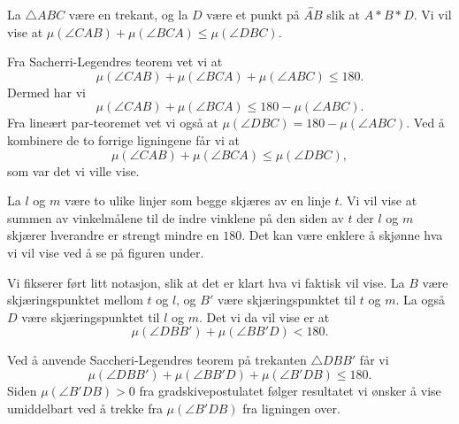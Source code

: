 \begin{oppgave}[4.5.1]
    La $\triangle ABC$ være en trekant, og la $D$ være et punkt på $\overleftrightarrow{AB}$ slik at $A\ast B\ast D$. 
    Vi vil vise at $\mu(\angle CAB)+\mu(\angle BCA)\leq \mu(\angle DBC)$. 

    \begin{figure}[H]
        \centering
        
    \end{figure}

    Fra Sacherri-Legendres teorem vet vi at $$\mu(\angle CAB)+\mu(\angle BCA)+\mu(\angle ABC)\leq 180.$$
    Dermed har vi $$\mu(\angle CAB)+\mu(\angle BCA)\leq 180-\mu(\angle ABC).$$
    Fra lineært par-teoremet vet vi også at $\mu(\angle DBC)=180-\mu(\angle ABC)$. 
    Ved å kombinere de to forrige ligningene får vi at
    $$\mu(\angle CAB)+\mu(\angle BCA)\leq \mu(\angle DBC),$$
    som var det vi ville vise. 
\end{oppgave}

\begin{oppgave}[4.5.2]
    La $l$ og $m$ være to ulike linjer som begge skjæres av en linje $t$. 
    Vi vil vise at summen av vinkelmålene til de indre vinklene på den siden av $t$ der $l$ og $m$ skjærer hverandre er strengt mindre en $180$. 
    Det kan være enklere å skjønne hva vi vil vise ved å se på figuren under.  

    Vi fikserer ført litt notasjon, slik at det er klart hva vi faktisk vil vise. 
    La $B$ være skjæringspunktet mellom $t$ og $l$, og $B'$ være skjæringspunktet til $t$ og $m$. 
    La også $D$ være skjæringspunktet til $l$ og $m$. 
    Det vi da vil vise er at $$\mu(\angle DBB')+\mu(\angle BB'D)< 180.$$

    \begin{figure}[H]
        \centering
        
    \end{figure}

    Ved å anvende Saccheri-Legendres teorem på trekanten $\triangle DBB'$ får vi 
    $$\mu(\angle DBB')+\mu(\angle BB'D)+\mu(\angle B'DB)\leq 180.$$
    Siden $\mu(\angle B'DB)>0$ fra gradskivepostulatet følger resultatet vi ønsker å vise umiddelbart ved å trekke fra $\mu(\angle B'DB)$ fra ligningen over. 
\end{oppgave}

